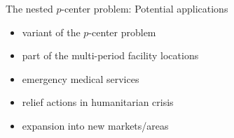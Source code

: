 \documentclass[utf8,aspectratio=169,ngerman,english]{beamer}
\renewcommand{\emph}[1]{\textcolor{jkuGreen}{#1}}
\begin{document}
\begin{frame}{The nested $p$-center problem: Potential applications}
\begin{itemize}
    \setlength\itemsep{1em}
    \item variant of the \emph{$p$-center problem}\pause %
    \item part of the \emph{multi-period} facility locations \pause %
    \item \emph{emergency} medical services \pause
    \item relief actions in \emph{humanitarian crisis} \pause
    \item \emph{expansion} into new markets/areas 
\end{itemize}
\end{frame}

\end{document}
